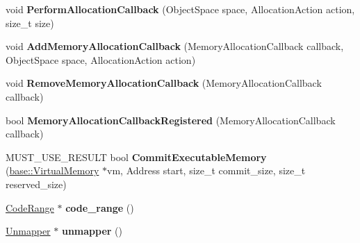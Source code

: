 \begin{DoxyCompactItemize}
\item 
void {\bfseries Perform\+Allocation\+Callback} (Object\+Space space, Allocation\+Action action, size\+\_\+t size)\hypertarget{classv8_1_1internal_1_1_memory_allocator_ad432ef0063273e468da05b7f1c29d78b}{}\label{classv8_1_1internal_1_1_memory_allocator_ad432ef0063273e468da05b7f1c29d78b}

\item 
void {\bfseries Add\+Memory\+Allocation\+Callback} (Memory\+Allocation\+Callback callback, Object\+Space space, Allocation\+Action action)\hypertarget{classv8_1_1internal_1_1_memory_allocator_aefc9142ca4bdf32a06ef0eba318a656c}{}\label{classv8_1_1internal_1_1_memory_allocator_aefc9142ca4bdf32a06ef0eba318a656c}

\item 
void {\bfseries Remove\+Memory\+Allocation\+Callback} (Memory\+Allocation\+Callback callback)\hypertarget{classv8_1_1internal_1_1_memory_allocator_adaec22ea2f91dbd2021093ab19305321}{}\label{classv8_1_1internal_1_1_memory_allocator_adaec22ea2f91dbd2021093ab19305321}

\item 
bool {\bfseries Memory\+Allocation\+Callback\+Registered} (Memory\+Allocation\+Callback callback)\hypertarget{classv8_1_1internal_1_1_memory_allocator_a1c2ad0f5d133bed2986f7ef40e60919a}{}\label{classv8_1_1internal_1_1_memory_allocator_a1c2ad0f5d133bed2986f7ef40e60919a}

\item 
M\+U\+S\+T\+\_\+\+U\+S\+E\+\_\+\+R\+E\+S\+U\+LT bool {\bfseries Commit\+Executable\+Memory} (\hyperlink{classv8_1_1base_1_1_virtual_memory}{base\+::\+Virtual\+Memory} $\ast$vm, Address start, size\+\_\+t commit\+\_\+size, size\+\_\+t reserved\+\_\+size)\hypertarget{classv8_1_1internal_1_1_memory_allocator_ae3e0006639ea9f5e27e482c5304a66ca}{}\label{classv8_1_1internal_1_1_memory_allocator_ae3e0006639ea9f5e27e482c5304a66ca}

\item 
\hyperlink{classv8_1_1internal_1_1_code_range}{Code\+Range} $\ast$ {\bfseries code\+\_\+range} ()\hypertarget{classv8_1_1internal_1_1_memory_allocator_a3aa36333ed70fa6ea99ab591080ac805}{}\label{classv8_1_1internal_1_1_memory_allocator_a3aa36333ed70fa6ea99ab591080ac805}

\item 
\hyperlink{classv8_1_1internal_1_1_memory_allocator_1_1_unmapper}{Unmapper} $\ast$ {\bfseries unmapper} ()\hypertarget{classv8_1_1internal_1_1_memory_allocator_a47e626016282b63c20f45fbf981d496d}{}\label{classv8_1_1internal_1_1_memory_allocator_a47e626016282b63c20f45fbf981d496d}

\end{DoxyCompactItemize}
